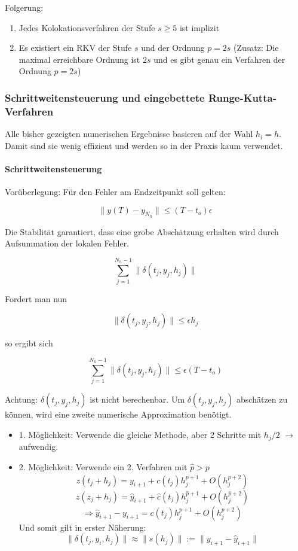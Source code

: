Folgerung: 
\begin{enumerate}
	\item Jedes Kolokationsverfahren der Stufe $s \ge 5$ ist implizit
	\item Es existiert ein RKV der Stufe $s$ und der Ordnung $p=2s$ (Zusatz: Die maximal erreichbare Ordnung ist $2s$ und es gibt genau ein Verfahren der Ordnung $p=2s$)
\end{enumerate}

\subsubsection{Schrittweitensteuerung und eingebettete Runge-Kutta-Verfahren}

Alle bisher gezeigten numerischen Ergebnisse basieren auf der Wahl $h_i = h$. Damit sind sie wenig effizient und werden so in der Praxis kaum verwendet.

\paragraph{Schrittweitensteuerung}

Vorüberlegung: Für den Fehler am Endzeitpunkt soll gelten:

$$\|y(T) - y_{N_h}\| \le (T-t_o)\epsilon$$

Die Stabilität garantiert, dass eine grobe Abschätzung erhalten wird durch Aufsummation der lokalen Fehler.

$$\sum_{j=1}^{N_h-1} \| \delta(t_j, y_j, h_j) \|$$

Fordert man nun 

$$\|\delta(t_j, y_j, h_j)\| \le \epsilon h_j$$

so ergibt sich

$$\sum_{j=1}^{N_h-1} \|\delta(t_j, y_j, h_j)\| \le \epsilon (T-t_o)$$

Achtung: $\delta(t_j, y_j, h_j)$ ist nicht berechenbar. Um $\delta(t_j, y_j, h_j)$ abschätzen zu können, wird eine zweite numerische Approximation benötigt.

\begin{itemize}
	\item 1. Möglichkeit: Verwende die gleiche Methode, aber 2 Schritte mit $h_j/2$ $\rightarrow$ aufwendig.
	\item 2. Möglichkeit: Verwende ein 2. Verfahren mit $\hat{p} > p$
		$$z(t_j + h_j) = y_{i+1} + c(t_j)h_j^{p+1} + O(h_j^{p+2})$$
		$$z(z_j + h_j) = \hat{y}_{i+1} + \hat{c}(t_j)h_j^{\hat{p}+1} + O(h_j^{\hat{p}+2})$$
		$$\Rightarrow \hat{y}_{i+1} - y_{i+1} = c(t_j) h_j^{p+1} + O(h_j^{p+2})$$
		Und somit gilt in erster Näherung:
		$$\|\delta(t_j, y_i, h_j)\| \approx \|s(h_j)\| := \|y_{i+1} - \hat{y}_{i+1}\|$$
\end{itemize}

